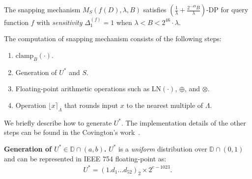 \begin{theorem}
    The snapping mechanism $M_{S}\left(f\left(D\right),\lambda,B\right)$ satisfies $\left(\frac{1}{\lambda}+\frac{2^{-49}B}{\lambda}\right) $-DP for query function $f$ with \textit{sensitivity} $\Delta _1^{\left(f\right) } =1$ when $\lambda<B<2^{46}\cdot\lambda$.
\end{theorem}



The computation of snapping mechanism consists of the following steps:
\begin{enumerate}
    \label{enu:snappingSteps}
    \item $\text{clamp}_B\left(\cdot\right) $.
    \item Generation of $U^{*}$ and $S$.
    \item Floating-point arithmetic operations such as $\text{LN}\left(\cdot\right) $, $\oplus$, and $\otimes $.
    \item Operation $\lfloor x\rceil_{\Lambda}$ that rounds input $x$ to the nearest multiple of $\Lambda $.
\end{enumerate}
We briefly describe how to generate $U^{*}$. The implementation details of the other steps can be found in the Covington's work~\cite{Covington2019}.



\textbf{Generation of $U^{*}\in\mathbb{D} \cap \left(a,b\right)  $.}
$U^{*}$ is a \textit{uniform} distribution over $\mathbb{D} \cap \left(0,1\right) $ and can be represented in IEEE 754 floating-point as:
\begin{equation}
    \begin{split}
        U^{*}=\left(1.d_{1}\ldots d_{52}\right)_{2}\times2^{e-1023}.
    \end{split}
\end{equation}

